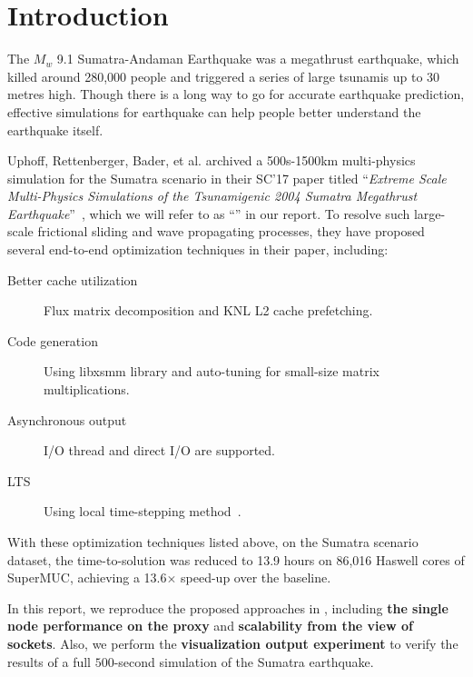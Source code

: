 \documentclass[5p,times]{sig-alternate-05-2015}
\begin{document}

\section{Introduction}

The $M_w$ 9.1 Sumatra-Andaman Earthquake was a megathrust earthquake, which killed around 280,000 people and triggered a series of large tsunamis up to 30 metres high. Though there is a long way to go for accurate earthquake prediction, effective simulations for earthquake can help people better understand the earthquake itself.

Uphoff, Rettenberger, Bader, et al. archived a 500s-1500km multi-physics simulation for the Sumatra scenario in their SC'17 paper titled ``\textit{Extreme Scale Multi-Physics Simulations of the Tsunamigenic 2004 Sumatra Megathrust Earthquake}''~\cite{Uphoff:2017:ESM:3126908.3126948}, which we will refer to as ``\OriginalPaper'' in our report. To resolve such large-scale frictional sliding and wave propagating processes, they have proposed several end-to-end optimization techniques in their paper, including:

\begin{description}

\item [Better cache utilization] Flux matrix decomposition and KNL L2 cache prefetching.

\item [Code generation] Using libxsmm library and auto-tuning for small-size matrix multiplications.

\item [Asynchronous output] I/O thread and direct I/O are supported.

\item [LTS] Using local time-stepping method~\cite{LTS:7516082}.

\end{description}

With these optimization techniques listed above, on the Sumatra scenario dataset, the time-to-solution was reduced to 13.9 hours on 86,016 Haswell cores of SuperMUC, achieving a 13.6$\times$ speed-up over the baseline.

In this report, we reproduce the proposed approaches in \OriginalPaper{}, including \textbf{the single node performance on the proxy} and \textbf{scalability from the view of sockets}. Also, we perform the \textbf{visualization output experiment} to verify the results of a full $500$-second simulation of the Sumatra earthquake.
\end{document}
